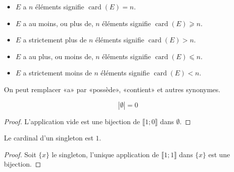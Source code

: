 \begin{vocabulary}
\par\noindent
\begin{itemize}
\item
\(𝐸\) a \(𝑛\) éléments signifie \(\operatorname{card}(𝐸)=𝑛\).
\item
\(𝐸\) a au moins, ou plus de, \(𝑛\) éléments signifie \(\operatorname{card}(𝐸)⩾𝑛\).
\item
\(𝐸\) a strictement plus de \(𝑛\) éléments signifie \(\operatorname{card}(𝐸)>𝑛\).
\item
\(𝐸\) a au plus, ou moins de, \(𝑛\) éléments signifie \(\operatorname{card}(𝐸)⩽𝑛\).
\item
\(𝐸\) a strictement moins de \(𝑛\) éléments signifie \(\operatorname{card}(𝐸)<𝑛\).
\end{itemize}
On peut remplacer «a» par «possède», «contient» et autres synonymes.
\end{vocabulary}
\begin{theorem}
\begin{equation*}
|∅|=0
\end{equation*}
\end{theorem}
\begin{proof}
L'application vide est une bijection de \(⟦1;0⟧\) dans \( ∅\).
\end{proof}
\begin{theorem}
Le cardinal d'un singleton est \(1\).
\end{theorem}
\begin{proof}
Soit \(\{𝑥\}\) le singleton, l'unique application de \(⟦1;1⟧\) dans \(\{𝑥\}\) est une bijection.
\end{proof}
